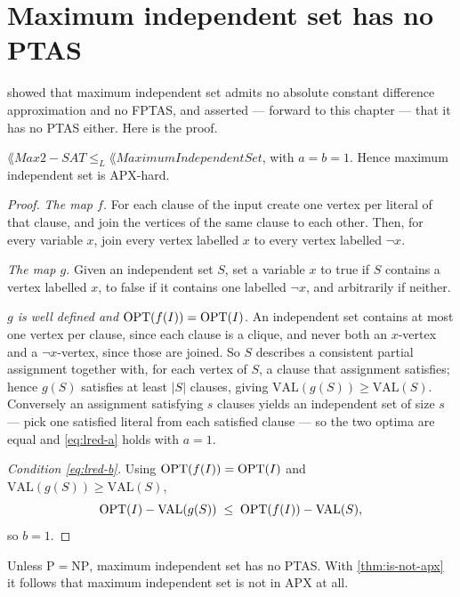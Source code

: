 \section{Maximum independent set has no PTAS}
\label{sec:mis-no-ptas}

 showed that maximum independent set admits no absolute
constant difference approximation and no FPTAS, and asserted --- forward to this
chapter --- that it has no PTAS either. Here is the proof.

\begin{theorem}\label{thm:max2sat-mis}
$\lang{Max 2-SAT} \le_L \lang{Maximum Independent Set}$, with $a = b = 1$.
Hence maximum independent set is APX-hard.
\end{theorem}

\begin{proof}
\emph{The map $f$.} For each clause of the input create one vertex per literal
of that clause, and join the vertices of the same clause to each other. Then, for
every variable $x$, join every vertex labelled $x$ to every vertex labelled
$\neg x$.

\emph{The map $g$.} Given an independent set $S$, set a variable $x$ to true if
$S$ contains a vertex labelled $x$, to false if it contains one labelled
$\neg x$, and arbitrarily if neither.

\emph{$g$ is well defined and $\mathrm{OPT}(f(I)) = \mathrm{OPT}(I)$.} An independent set
contains at most one vertex per clause, since each clause is a clique, and never
both an $x$-vertex and a $\neg x$-vertex, since those are joined. So $S$
describes a consistent partial assignment together with, for each vertex of $S$,
a clause that assignment satisfies; hence $g(S)$ satisfies at least $|S|$
clauses, giving $\mathrm{VAL}(g(S)) \ge \mathrm{VAL}(S)$. Conversely an
assignment satisfying $s$ clauses yields an independent set of size $s$ --- pick
one satisfied literal from each satisfied clause --- so the two optima are equal
and \eqref{eq:lred-a} holds with $a = 1$.

\emph{Condition \eqref{eq:lred-b}.} Using $\mathrm{OPT}(f(I)) = \mathrm{OPT}(I)$ and
$\mathrm{VAL}(g(S)) \ge \mathrm{VAL}(S)$,
\[ \mathrm{OPT}(I) - \mathrm{VAL}(g(S)) \;\le\; \mathrm{OPT}(f(I)) - \mathrm{VAL}(S), \]
so $b = 1$.
\end{proof}

\begin{corollary}\label{cor:mis-no-ptas}
Unless $\mathrm{P} = \mathrm{NP}$, maximum independent set has no PTAS. With
\cref{thm:is-not-apx} it follows that maximum independent set is not in APX at
all.
\end{corollary}

